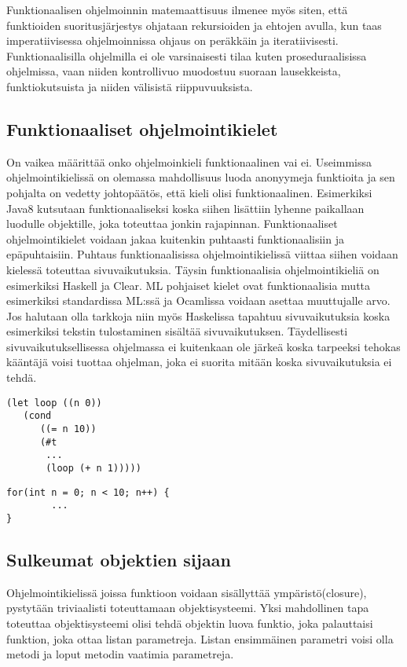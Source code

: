 \documentclass[12pt]{article}
\begin{document}
Funktionaalisen ohjelmoinnin matemaattisuus ilmenee myös siten, että funktioiden suoritusjärjestys ohjataan rekursioiden ja ehtojen avulla, kun taas imperatiivisessa ohjelmoinnissa ohjaus on peräkkäin ja iteratiivisesti. Funktionaalisilla ohjelmilla ei ole varsinaisesti tilaa kuten proseduraalisissa ohjelmissa, vaan niiden kontrollivuo muodostuu suoraan lausekkeista, funktiokutsuista ja niiden välisistä riippuvuuksista.


\subsection{Funktionaaliset ohjelmointikielet}
On vaikea määrittää onko ohjelmoinkieli funktionaalinen vai ei. Useimmissa ohjelmointikielissä on olemassa mahdollisuus luoda anonyymeja funktioita ja sen pohjalta on vedetty johtopäätös, että kieli olisi funktionaalinen. Esimerkiksi Java8 kutsutaan funktionaaliseksi koska siihen lisättiin lyhenne paikallaan luodulle objektille, joka toteuttaa jonkin rajapinnan.
Funktionaaliset ohjelmointikielet voidaan jakaa kuitenkin puhtaasti funktionaalisiin ja epäpuhtaisiin. Puhtaus funktionaalisissa ohjelmointikielissä viittaa siihen voidaan kielessä toteuttaa sivuvaikutuksia. 
Täysin funktionaalisia ohjelmointikieliä on esimerkiksi Haskell ja Clear. ML pohjaiset kielet ovat funktionaalisia mutta esimerkiksi standardissa ML:ssä ja Ocamlissa voidaan asettaa muuttujalle arvo.
Jos halutaan olla tarkkoja niin myös Haskelissa tapahtuu sivuvaikutuksia koska esimerkiksi tekstin tulostaminen sisältää sivuvaikutuksen. Täydellisesti sivuvaikutuksellisessa ohjelmassa ei kuitenkaan ole järkeä koska tarpeeksi tehokas kääntäjä voisi tuottaa ohjelman, joka ei suorita mitään koska sivuvaikutuksia ei tehdä.



\begin{lstlisting}
(let loop ((n 0))
   (cond
      ((= n 10))
      (#t
       ...
       (loop (+ n 1)))))      
\end{lstlisting}
\begin{lstlisting}
for(int n = 0; n < 10; n++) {
        ...
}
\end{lstlisting}


\subsection{Sulkeumat objektien sijaan}
Ohjelmointikielissä joissa funktioon voidaan sisällyttää ympäristö(closure), pystytään triviaalisti toteuttamaan objektisysteemi.
Yksi mahdollinen tapa toteuttaa objektisysteemi olisi tehdä objektin luova funktio, joka palauttaisi funktion, joka ottaa listan parametreja.
Listan ensimmäinen parametri voisi olla metodi ja loput metodin vaatimia parametreja.
\begin{lstlisting}

\end{lstlisting}
\end{document}
